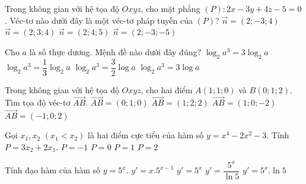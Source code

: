 \begin{ex}%
	Trong không gian với hệ tọa độ $Oxyz$, cho mặt phẳng $(P): 2x-3y+4z-5=0$. Véc-tơ nào dưới đây là một véc-tơ pháp tuyến của $(P)$?
	\choice
	{\True $\vec{n}=(2;-3;4)$}
	{$\vec{n}=(2;3;4)$}
	{$\vec{n}=(2;4;5)$}
	{$\vec{n}=(2;-3;-5)$}
\end{ex}

\begin{ex}%
	Cho $a$ là số thực dương. Mệnh đề nào dưới đây đúng?
	\choice
	{\True $\log_2a^3=3\log_2a$}
	{$\log_2a^3=\dfrac{1}{3}\log_2a$}
	{$\log_2a^3=\dfrac{3}{2}\log a$}
	{$\log_2a^3=3\log a$}
\end{ex}

\begin{ex}%
	Trong không gian với hệ tọa độ $Oxyz$, cho hai điểm $A(1;1;0)$ và $B(0;1;2)$. Tìm tọa độ véc-tơ $\overrightarrow{AB}$.
	\choice
	{$\overrightarrow{AB}=(0;1;0)$}
	{$\overrightarrow{AB}=(1;2;2)$}
	{$\overrightarrow{AB}=(1;0;-2)$}
	{\True $\overrightarrow{AB}=(-1;0;2)$}
\end{ex}

\begin{ex}%
	Gọi $x_1,x_2$ $(x_1<x_2)$ là hai điểm cực tiểu của hàm số $y=x^4-2x^2-3$. Tính $P=3x_2+2x_1$.
	\choice
	{$P=-1$}
	{$P=0$}
	{\True $P=1$}
	{$P=2$}
\end{ex}

\begin{ex}%
	Tính đạo hàm của  hàm số $y=5^x$.
	\choice
	{$y'=x.5^{x-1}$}
	{$y'=5^x$}
	{$y'=\dfrac{5^x}{\ln 5}$}
	{\True $y'=5^x.\ln 5$}
\end{ex}

